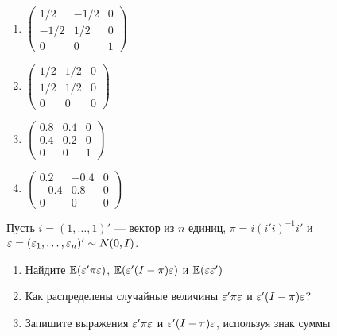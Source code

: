 \documentclass[pdftex,11pt,openany]{book}\usepackage[]{graphicx}\usepackage[]{color}
\begin{document}
\begin{problem}
\begin{enumerate}
\item
$\begin{pmatrix} 1/2 & -1/2 & 0 \\ -1/2 & 1/2 & 0 \\ 0 & 0 & 1 \end{pmatrix}$


\item
$\begin{pmatrix} 1/2 & 1/2 & 0 \\ 1/2 & 1/2 & 0 \\ 0 & 0 & 0 \end{pmatrix}$


\item 
$\begin{pmatrix} 0.8 & 0.4 & 0 \\ 0.4 & 0.2 & 0 \\ 0 & 0 & 1 \end{pmatrix}$


\item 
$\begin{pmatrix} 0.2 & -0.4 & 0 \\ -0.4 & 0.8 & 0 \\ 0 & 0 & 0 \end{pmatrix}$


\end{enumerate}
\end{problem}

\begin{solution}
\end{solution}

\begin{problem}
Пусть $i = (1,\dots,1)'$ --- вектор из $n$ единиц, $\pi=i(i'i)^{-1}i'$ и $\varepsilon = (\varepsilon_1,\dots,\varepsilon_n)'\sim N (0,I)$.
\begin{enumerate}
\item Найдите $\mathbb{E}(\varepsilon'\pi\varepsilon)$, $\mathbb{E}(\varepsilon'(I-\pi)\varepsilon)$ и $\mathbb{E}(\varepsilon\varepsilon')$
\item Как распределены случайные величины $\varepsilon'\pi\varepsilon$ и $\varepsilon'(I-\pi)\varepsilon$?
\item Запишите выражения $\varepsilon'\pi\varepsilon$ и $\varepsilon'(I-\pi)\varepsilon$, используя знак суммы
\end{enumerate}
\end{problem}


\begin{solution}
\end{solution}
\end{document}
